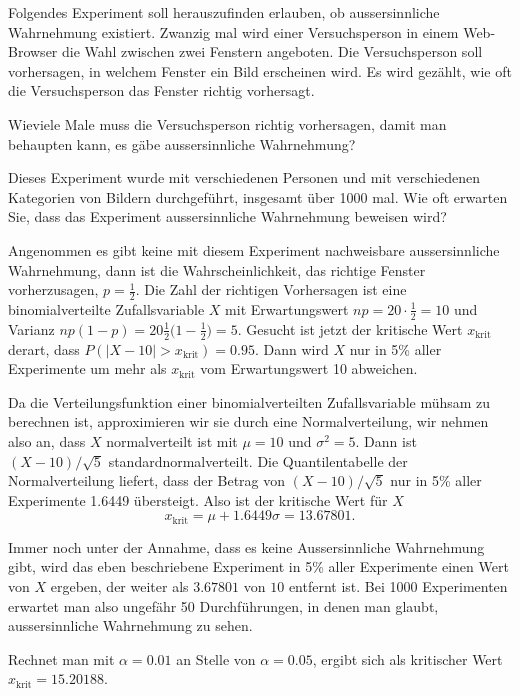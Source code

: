 Folgendes Experiment soll herauszufinden erlauben, ob aussersinnliche
Wahrnehmung existiert.
Zwanzig mal wird einer Versuchsperson in einem Web-Browser die Wahl zwischen
zwei Fenstern angeboten. Die Versuchsperson soll vorhersagen,
in welchem Fenster ein Bild erscheinen wird. Es wird gezählt,
wie oft die Versuchsperson das Fenster richtig vorhersagt.
\begin{teilaufgaben}
\item Wieviele Male muss die Versuchsperson richtig vorhersagen,
damit man behaupten kann, es gäbe aussersinnliche Wahrnehmung?
\item Dieses Experiment wurde mit verschiedenen Personen
und mit verschiedenen Kategorien von Bildern durchgeführt,
insgesamt über 1000 mal. Wie oft erwarten Sie, dass das
Experiment aussersinnliche Wahrnehmung beweisen wird?
\end{teilaufgaben}


\begin{loesung}
\begin{teilaufgaben}
\item Angenommen es gibt keine mit diesem Experiment nachweisbare
aussersinnliche Wahrnehmung, dann ist die Wahrscheinlichkeit, das
richtige Fenster vorherzusagen, $p=\frac12$. Die Zahl der richtigen
Vorhersagen ist eine binomialverteilte Zufallsvariable $X$ mit
Erwartungswert $np=20\cdot\frac12=10$ und Varianz
$np(1-p)=20\frac12\bigl(1-\frac12\bigr)=5$. Gesucht ist jetzt
der kritische Wert $x_{\text{krit}}$ derart, dass
$P(|X-10| > x_{\text{krit}})=0.95$. Dann wird $X$ nur in 5\% aller
Experimente um mehr als $x_{\text{krit}}$ vom Erwartungswert 10 abweichen.

Da die Verteilungsfunktion einer binomialverteilten Zufallsvariable
mühsam zu berechnen ist, approximieren wir sie durch eine Normalverteilung,
wir nehmen also an, dass $X$ normalverteilt ist mit $\mu = 10$
und $\sigma^2=5$. Dann ist $(X-10)/\sqrt{5}$ standardnormalverteilt.
Die Quantilentabelle der Normalverteilung liefert, dass der Betrag
von $(X-10)/\sqrt{5}$
nur in 5\% aller Experimente 1.6449 übersteigt. Also ist der kritische
Wert für $X$
\[
x_{\text{krit}} =  \mu + 1.6449 \sigma =  13.67801.
\]
\item
Immer noch unter der Annahme, dass es keine Aussersinnliche Wahrnehmung
gibt, wird das eben beschriebene Experiment in 5\% aller Experimente
einen Wert von $X$ ergeben, der weiter als $3.67801$ von $10$ entfernt
ist. Bei 1000 Experimenten erwartet man also ungefähr 50 Durchführungen,
in denen man glaubt, aussersinnliche Wahrnehmung zu sehen.
\end{teilaufgaben}
Rechnet man mit $\alpha = 0.01$ an Stelle von $\alpha = 0.05$,
ergibt sich als kritischer Wert $x_{\text{krit}}=15.20188$.
\end{loesung}

